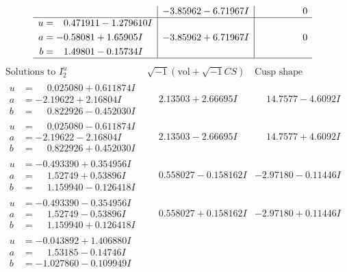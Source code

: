\documentclass[1p]{elsarticle_modified}
\theoremstyle{definition}
\newcommand{\I}{\sqrt{-1}}
\begin{document}
$$\begin{array}{c|c|c}
 & -3.85962 - 6.71967 I & \phantom{-0.000000 } 0 \\ \hline\begin{aligned}
u &= \phantom{-}0.471911 - 1.279610 I \\
a &= -0.58081 + 1.65905 I \\
b &= \phantom{-}1.49801 - 0.15734 I\end{aligned}
 & -3.85962 + 6.71967 I & \phantom{-0.000000 } 0\\
 \hline 
 \end{array}$$\newpage$$\begin{array}{c|c|c}  
\text{Solutions to }I^u_{2}& \I (\text{vol} + \sqrt{-1}CS) & \text{Cusp shape}\\
 \hline 
\begin{aligned}
u &= \phantom{-}0.025080 + 0.611874 I \\
a &= -2.19622 + 2.16804 I \\
b &= \phantom{-}0.822926 - 0.452030 I\end{aligned}
 & \phantom{-}2.13503 + 2.66695 I & \phantom{-}14.7577 - 4.6092 I \\ \hline\begin{aligned}
u &= \phantom{-}0.025080 - 0.611874 I \\
a &= -2.19622 - 2.16804 I \\
b &= \phantom{-}0.822926 + 0.452030 I\end{aligned}
 & \phantom{-}2.13503 - 2.66695 I & \phantom{-}14.7577 + 4.6092 I \\ \hline\begin{aligned}
u &= -0.493390 + 0.354956 I \\
a &= \phantom{-}1.52749 + 0.53896 I \\
b &= \phantom{-}1.159940 - 0.126418 I\end{aligned}
 & \phantom{-}0.558027 - 0.158162 I & -2.97180 - 0.11446 I \\ \hline\begin{aligned}
u &= -0.493390 - 0.354956 I \\
a &= \phantom{-}1.52749 - 0.53896 I \\
b &= \phantom{-}1.159940 + 0.126418 I\end{aligned}
 & \phantom{-}0.558027 + 0.158162 I & -2.97180 + 0.11446 I \\ \hline\begin{aligned}
u &= -0.043892 + 1.406880 I \\
a &= \phantom{-}1.53185 - 0.14746 I \\
b &= -1.027860 - 0.109949 I\end{aligned}

\end{array}$$
\end{document}
